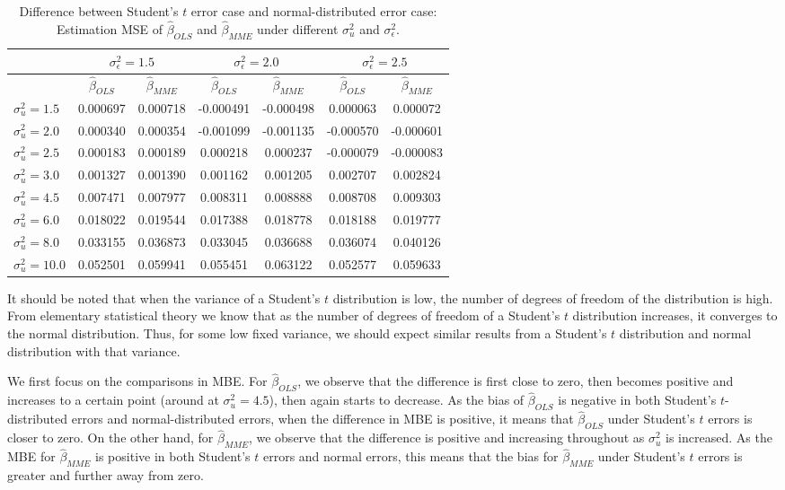 \documentclass{article}
\begin{document}
\begin{table}[ht]
    \centering
    \caption{Difference between Student's $t$ error case and normal-distributed error case: Estimation MSE of $\hat{\beta}_{OLS}$ and $\hat{\beta}_{MME}$ under different $\sigma^2_u$ and $\sigma^2_\epsilon$.}
    \label{Tab:MSE_diff_t_normal}
    \begin{tabular}[t]{lcccccc}
        \hline
        &\multicolumn{2}{c}{$\sigma^2_\epsilon=1.5$}&\multicolumn{2}{c}{$\sigma^2_\epsilon=2.0$}&\multicolumn{2}{c}{$\sigma^2_\epsilon=2.5$}\\
        \hline
        &$\hat{\beta}_{OLS}$&$\hat{\beta}_{MME}$&$\hat{\beta}_{OLS}$&$\hat{\beta}_{MME}$&$\hat{\beta}_{OLS}$&$\hat{\beta}_{MME}$\\
        \hline
        $\sigma^2_u = 1.5$&0.000697&0.000718&-0.000491&-0.000498&0.000063&0.000072\\
        $\sigma^2_u = 2.0$&0.000340&0.000354&-0.001099&-0.001135&-0.000570&-0.000601\\
        $\sigma^2_u = 2.5$&0.000183&0.000189&0.000218&0.000237&-0.000079&-0.000083\\
        $\sigma^2_u = 3.0$&0.001327&0.001390&0.001162&0.001205&0.002707&0.002824\\
        $\sigma^2_u = 4.5$&0.007471&0.007977&0.008311&0.008888&0.008708&0.009303\\
        $\sigma^2_u = 6.0$&0.018022&0.019544&0.017388&0.018778&0.018188&0.019777\\
        $\sigma^2_u = 8.0$&0.033155&0.036873&0.033045&0.036688&0.036074&0.040126\\
        $\sigma^2_u = 10.0$&0.052501&0.059941&0.055451&0.063122&0.052577&0.059633\\
        \hline
    \end{tabular}
\end{table}

It should be noted that when the variance of a Student's $t$ distribution is low, the number of degrees of freedom of the distribution is high. 
From elementary statistical theory we know that as the number of degrees of freedom of a Student's $t$ distribution increases, it converges to the normal distribution.
Thus, for some low fixed variance, we should expect similar results from a Student's $t$ distribution and normal distribution with that variance.

We first focus on the comparisons in MBE.
For $\hat{\beta}_{OLS}$, we observe that the difference is first close to zero, then becomes positive and increases to a certain point (around at $\sigma^2_u = 4.5$), then again starts to decrease.
As the bias of $\hat{\beta}_{OLS}$ is negative in both Student's $t$-distributed errors and normal-distributed errors,
when the difference in MBE is positive, it means that $\hat{\beta}_{OLS}$ under Student's $t$ errors is closer to zero.
On the other hand, for $\hat{\beta}_{MME}$, we observe that the difference is positive and increasing throughout as $\sigma^2_u$ is increased.
As the MBE for $\hat{\beta}_{MME}$ is positive in both Student's $t$ errors and normal errors, this means that the bias for $\hat{\beta}_{MME}$ under Student's $t$ errors is greater and further away from zero.
\end{document}
